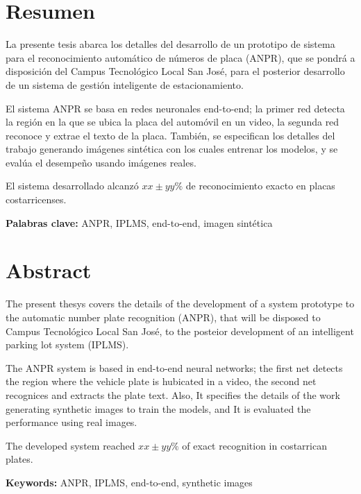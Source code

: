 \chapter*{Resumen}
\thispagestyle{empty}

La presente tesis abarca los detalles del desarrollo de un prototipo
de sistema para el reconocimiento automático de números de placa (ANPR),
que se pondrá a disposición del Campus Tecnológico Local San José,
para el posterior desarrollo de un sistema de gestión inteligente de estacionamiento. 

El sistema ANPR se basa en redes neuronales end-to-end; la 
primer red detecta la región en la que se ubica la placa del automóvil en un video, la
segunda red reconoce y extrae el texto de la placa.
También, se especifican los detalles del trabajo generando imágenes sintética con 
los cuales entrenar los modelos, y se evalúa el desempeño usando imágenes reales.

El sistema desarrollado alcanzó $xx\pm yy\%$ de reconocimiento exacto en placas costarricenses.

\bigskip

\textbf{Palabras clave:} ANPR, IPLMS, end-to-end, imagen sintética \thesisKeywords

\clearpage
\chapter*{Abstract}
\thispagestyle{empty}

The present thesys covers the details of the development of a system prototype 
to the automatic number plate recognition (ANPR), that will be disposed to Campus Tecnológico Local San José,
to the posteior development of an intelligent  parking lot system (IPLMS).

The ANPR system is based in end-to-end neural networks; the first net detects the region where 
the vehicle plate is hubicated in a video, the second net recognices and extracts the plate text. Also, It 
specifies the details of the work generating synthetic images to train the models, and It is evaluated
the performance using real images.

The developed system reached $xx\pm yy\%$ of exact recognition in costarrican plates.

\bigskip

\textbf{Keywords:} ANPR, IPLMS, end-to-end, synthetic images

\cleardoublepage


